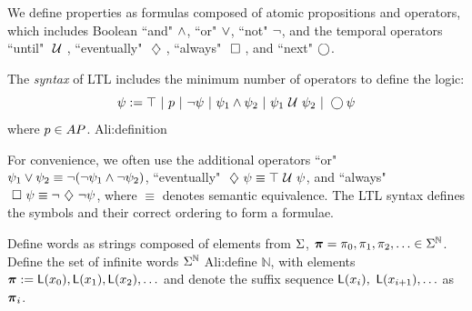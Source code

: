 \documentclass{ifacconf}
\renewcommand{\axx}[1]{{\color{orange} Ali:#1}}
\begin{document}
 We define properties as formulas composed of atomic propositions and operators, which includes 
 Boolean ``and" $\wedge$, ``or" $\vee$, ``not" $\neg$, and the temporal operators ``until" $\ \mathcal{U}\ $, ``eventually" $\ \diamondsuit\ $, ``always" $\ \square\ $, and ``next" $\bigcirc$.
    \begin{definition}
    \label{def:gdtl-syntax}
    The {\em syntax} of LTL includes the minimum number of operators to define the logic:
    \begin{equation*}
     \psi :=  \True \ |\ p \ |\ \notltl \psi \ |\ \psi_1 \andltl \psi_2 \ |\ \psi_1 \Until \psi_2 \ |\ \Next \psi
    \end{equation*} 
    where $p\in AP$. \axx{\AP definition}
    \end{definition}
    For convenience, we often use the additional operators 
    ``or"  $\psi_1 \vee \psi_2 \equiv  \neg (\neg \psi_1 \wedge \neg \psi_2)$, ``eventually"
    $\ \diamondsuit\  \psi \equiv \top \ \mathcal{U}\  \psi$, and
   ``always"  $\ \square\  \psi \equiv \neg \ \diamondsuit\  \neg \psi$,
    where $\equiv$ denotes semantic equivalence. 
 The LTL syntax defines the symbols and their correct ordering to form a formulae. %
%    

    Define words as strings composed of elements from $\Sigma$, ${\boldsymbol{\pi}}=\pi_0,\pi_1,\pi_2,\ldots\in\Sigma^{\mathbb{N}}$.
    Define the set of infinite
    words $\Sigma^{\mathbb N}$ \axx{define $\mathbb N$}, with elements 
${\boldsymbol{\pi}}:=\mathsf{L}(x_0),\mathsf{L}(x_1),\mathsf{L}(x_2), \ldots$ and denote the suffix sequence  $\mathsf{L}(x_i),$ $\mathsf{L}(x_{i+1}), \ldots$ as ${\boldsymbol{\pi}}_i$.
\end{document}
